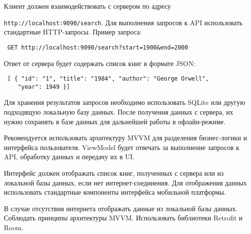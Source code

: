 \documentclass[a4paper,12pt]{article}
\begin{document}
Клиент должен взаимодействовать с сервером по адресу 

\texttt{http://localhost:9090/search}. Для выполнения запросов к API использовать стандартные HTTP-запросы. Пример запроса:

\begin{verbatim} GET http://localhost:9090/search?start=1900&end=2000 \end{verbatim}

Ответ от сервера будет содержать список книг в формате JSON:

\begin{verbatim} [ { "id": "1", "title": "1984", "author": "George Orwell", 
    "year": 1949 }] \end{verbatim}


Для хранения результатов запросов необходимо использовать SQLite или другую подходящую локальную базу данных. После получения данных с сервера, их нужно сохранять в базе данных для дальнейшей работы в офлайн-режиме.


Рекомендуется использовать архитектуру MVVM для разделения бизнес-логики и интерфейса пользователя. ViewModel будет отвечать за выполнение запросов к API, обработку данных и передачу их в UI.


Интерфейс должен отображать список книг, полученных с сервера или из локальной базы данных, если нет интернет-соединения. Для отображения данных использовать стандартные компоненты интерфейса мобильной платформы.


В случае отсутствия интернета отображать данные из локальной базы данных.
Соблюдать принципы архитектуры MVVM.
Использовать библиотеки Retrofit и Room.
\end{document}
